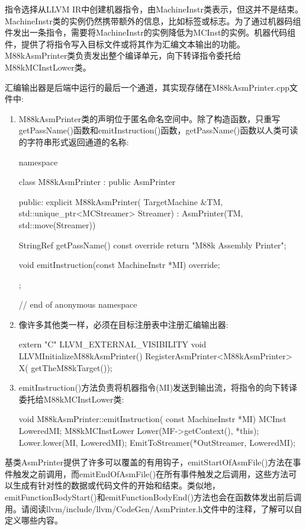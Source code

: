 指令选择从LLVM IR中创建机器指令，由MachineInstr类表示，但这并不是结束。MachineInstr类的实例仍然携带额外的信息，比如标签或标志。为了通过机器码组件发出一条指令，需要将MachineInstr的实例降低为MCInst的实例。机器代码组件，提供了将指令写入目标文件或将其作为汇编文本输出的功能。M88kAsmPrinter类负责发出整个编译单元，向下转译指令委托给M88kMCInstLower类。

汇编输出器是后端中运行的最后一个通道，其实现存储在M88kAsmPrinter.cpp文件中:

\begin{enumerate}
\item
M88kAsmPrinter类的声明位于匿名命名空间中。除了构造函数，只重写getPassName()函数和emitInstruction()函数，getPassName()函数以人类可读的字符串形式返回通道的名称:

\begin{cpp}
namespace {
class M88kAsmPrinter : public AsmPrinter {
public:
    explicit M88kAsmPrinter(
        TargetMachine &TM,
        std::unique_ptr<MCStreamer> Streamer)
        : AsmPrinter(TM, std::move(Streamer)) {}

    StringRef getPassName() const override {
        return "M88k Assembly Printer";
    }

    void emitInstruction(const MachineInstr *MI) override;
};
} // end of anonymous namespace
\end{cpp}

\item
像许多其他类一样，必须在目标注册表中注册汇编输出器:

\begin{cpp}
extern "C" LLVM_EXTERNAL_VISIBILITY void
LLVMInitializeM88kAsmPrinter() {
    RegisterAsmPrinter<M88kAsmPrinter> X(
        getTheM88kTarget());
}
\end{cpp}

\item
emitInstruction()方法负责将机器指令(MI)发送到输出流，将指令的向下转译委托给M88kMCInstLower类:

\begin{cpp}
void M88kAsmPrinter::emitInstruction(
        const MachineInstr *MI) {
    MCInst LoweredMI;
    M88kMCInstLower Lower(MF->getContext(), *this);
    Lower.lower(MI, LoweredMI);
    EmitToStreamer(*OutStreamer, LoweredMI);
}
\end{cpp}
\end{enumerate}

基类AsmPrinter提供了许多可以覆盖的有用钩子，emitStartOfAsmFile()方法在事件触发之前调用，而emitEndOfAsmFile()在所有事件触发之后调用，这些方法可以生成有针对性的数据或代码文件的开始和结束。类似地，emitFunctionBodyStart()和emitFunctionBodyEnd()方法也会在函数体发出前后调用。请阅读llvm/include/llvm/CodeGen/AsmPrinter.h文件中的注释，了解可以自定义哪些内容。

